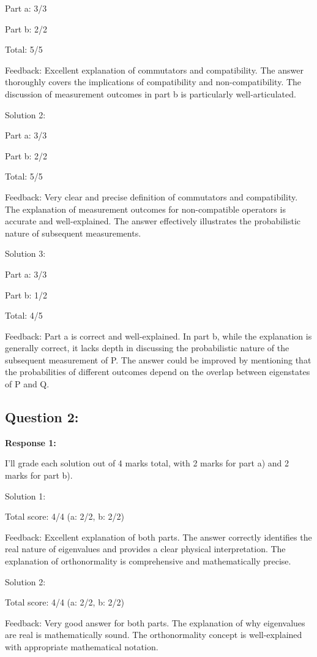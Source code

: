 \documentclass[a4paper,11pt]{article}
\begin{document}
Part a: 3/3

Part b: 2/2

Total: 5/5

Feedback: Excellent explanation of commutators and compatibility. The answer thoroughly covers the implications of compatibility and non-compatibility. The discussion of measurement outcomes in part b is particularly well-articulated.

Solution 2:

Part a: 3/3

Part b: 2/2

Total: 5/5

Feedback: Very clear and precise definition of commutators and compatibility. The explanation of measurement outcomes for non-compatible operators is accurate and well-explained. The answer effectively illustrates the probabilistic nature of subsequent measurements.

Solution 3:

Part a: 3/3

Part b: 1/2

Total: 4/5

Feedback: Part a is correct and well-explained. In part b, while the explanation is generally correct, it lacks depth in discussing the probabilistic nature of the subsequent measurement of P. The answer could be improved by mentioning that the probabilities of different outcomes depend on the overlap between eigenstates of P and Q.

\subsection*{Question 2:}

\textbf{Response 1:}

I'll grade each solution out of 4 marks total, with 2 marks for part a) and 2 marks for part b).

Solution 1:

Total score: 4/4 (a: 2/2, b: 2/2)

Feedback: Excellent explanation of both parts. The answer correctly identifies the real nature of eigenvalues and provides a clear physical interpretation. The explanation of orthonormality is comprehensive and mathematically precise.

Solution 2:

Total score: 4/4 (a: 2/2, b: 2/2)

Feedback: Very good answer for both parts. The explanation of why eigenvalues are real is mathematically sound. The orthonormality concept is well-explained with appropriate mathematical notation.
\end{document}
